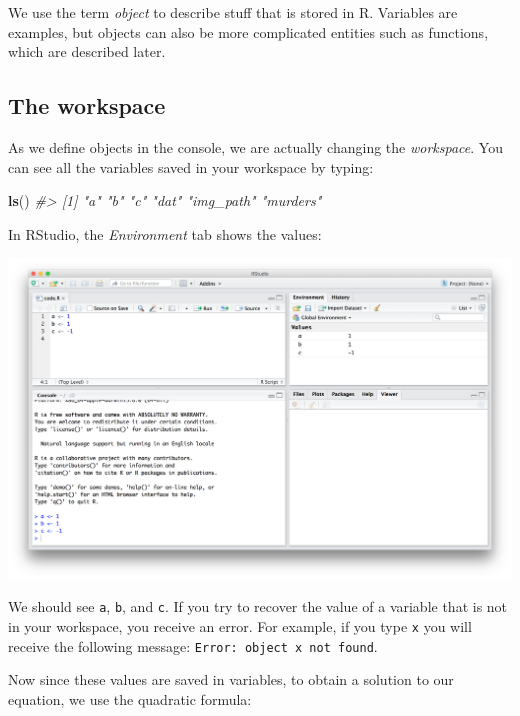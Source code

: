 \documentclass[
]{krantz}
\newenvironment{Shaded}{\begin{snugshade}}{\end{snugshade}}
\newcommand{\CommentTok}[1]{\textcolor[rgb]{0.37,0.37,0.37}{\textit{#1}}}
\newcommand{\KeywordTok}[1]{\textcolor[rgb]{0.27,0.27,0.27}{\textbf{#1}}}
\newcommand{\NormalTok}[1]{#1}
\begin{document}
We use the term \emph{object} to describe stuff that is stored in R. Variables are examples, but objects can also be more complicated entities such as functions, which are described later.

\hypertarget{the-workspace}{%
\subsection{The workspace}\label{the-workspace}}

As we define objects in the console, we are actually changing the \emph{workspace}. You can see all the variables saved in your workspace by typing:

\begin{Shaded}
\begin{Highlighting}[]
\KeywordTok{ls}\NormalTok{()}
\CommentTok{#> [1] "a"        "b"        "c"        "dat"      "img_path" "murders"}
\end{Highlighting}
\end{Shaded}

In RStudio, the \emph{Environment} tab shows the values:

\begin{center}\includegraphics[width=0.7\linewidth]{R/img/rstudio-environment} \end{center}

We should see \texttt{a}, \texttt{b}, and \texttt{c}. If you try to recover the value of a variable that is not in your workspace, you receive an error. For example, if you type \texttt{x} you will receive the following message: \texttt{Error:\ object\ \textquotesingle{}x\textquotesingle{}\ not\ found}.

Now since these values are saved in variables, to obtain a solution to our equation, we use the quadratic formula:
\end{document}
